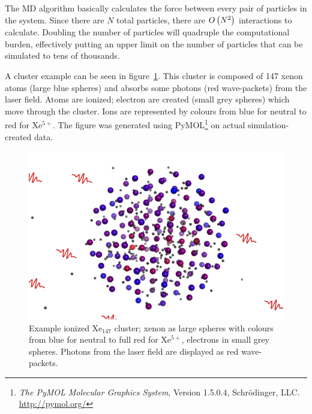 The MD algorithm basically calculates the force between every pair of particles
in the system. Since there are $N$ total particles, there are $O\left( N^2 \right)$
interactions to calculate. Doubling the number of particles will quadruple the
computational burden, effectively putting an upper limit on the number of
particles that can be simulated to tens of thousands.

A cluster example can be seen in figure~\ref{fig:md:cluster}.
This cluster is composed
of 147 xenon atoms (large blue spheres) and absorbs some photons (red
wave-packets) from the laser field. Atoms are ionized; electron are created
(small grey spheres) which move through the cluster. Ions are represented by
colours from blue for neutral to red for Xe$^{5+}$. The figure was
generated using
PyMOL\footnote{\textit{The PyMOL Molecular Graphics System}, Version 1.5.0.4,
Schrödinger, LLC. \url{http://pymol.org/}} on actual simulation-created data.


\begin{figure}
 \centering
 \includegraphics[width=\figurewidth]{figures/cluster}
 \caption{\label{fig:md:cluster}Example ionized Xe$_{147}$ cluster; xenon as
          large spheres with colours from blue for neutral to full red for
          Xe$^{5+}$, electrons in small grey spheres. Photons from the laser
          field are displayed as red wave-packets.}
\end{figure}

